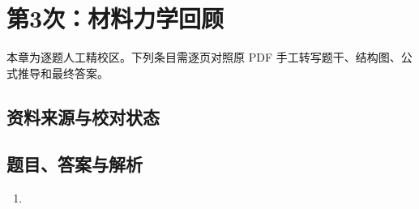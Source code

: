 \chapter{第3次：材料力学回顾}

本章为逐题人工精校区。下列条目需逐页对照原 PDF 手工转写题干、结构图、公式推导和最终答案。

\section{资料来源与校对状态}


\section{题目、答案与解析}

\begin{enumerate}[label=\textbf{第\arabic*题},wide]
  \item
  \begin{problemBox}
  \end{problemBox}

  \begin{solutionBox}
  \end{solutionBox}
\end{enumerate}
